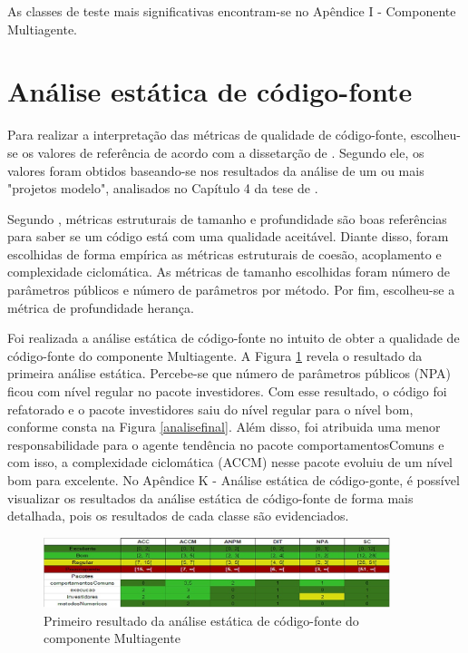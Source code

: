 As classes de teste mais significativas encontram-se no Apêndice I - Componente Multiagente.

\section{Análise estática de código-fonte}
Para realizar a interpretação das métricas de qualidade de código-fonte, escolheu-se os valores de referência de acordo com a dissetarção de \cite{filho}. Segundo ele, os valores foram obtidos baseando-se nos resultados da análise de um ou mais "projetos
modelo", analisados no Capítulo 4 da tese de \cite{meirelles2013}.

Segundo \cite{braga2012}, métricas estruturais de tamanho e profundidade são boas referências para saber se um código está com uma qualidade aceitável. Diante disso, foram escolhidas de forma empírica as métricas estruturais de coesão, acoplamento e complexidade ciclomática. As métricas de tamanho escolhidas foram número de parâmetros públicos e número de parâmetros por método. Por fim, escolheu-se a métrica de profundidade herança.

Foi realizada a análise estática de código-fonte no intuito de obter a qualidade de código-fonte do componente Multiagente. A Figura \ref{analiseinicial} revela o resultado da primeira análise estática. Percebe-se que número de parâmetros públicos (NPA) ficou com nível regular no pacote investidores. Com esse resultado, o código foi refatorado e o pacote investidores saiu do nível regular para o nível bom, conforme consta na Figura \ref{analisefinal}. Além disso, foi atribuida uma menor responsabilidade para o agente tendência no pacote comportamentosComuns e com isso, a complexidade ciclomática (ACCM) nesse pacote evoluiu de um nível bom para excelente. No Apêndice K - Análise estática de código-gonte, é possível visualizar os resultados da análise estática de código-fonte de forma mais detalhada, pois os resultados de cada classe são evidenciados.

\begin{figure}[H]
\centering
\includegraphics[width=0.9\textwidth]{figuras/analiseinicial}
\caption{Primeiro resultado da análise estática de código-fonte do componente Multiagente}
\label{analiseinicial}
\end{figure}

